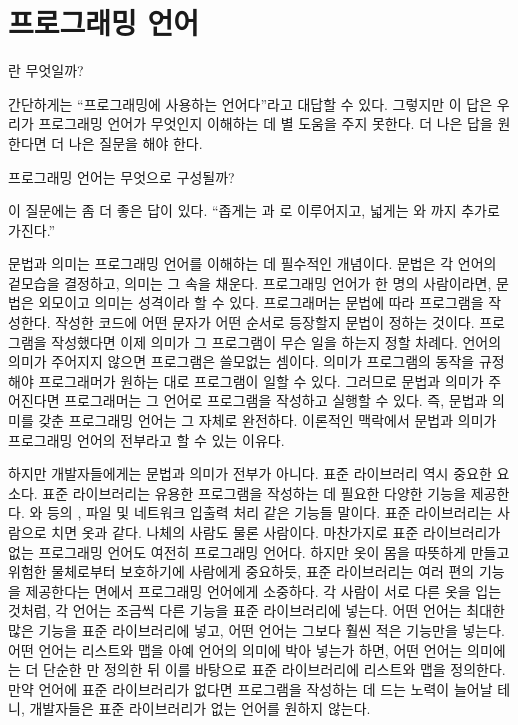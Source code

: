 \chapter{프로그래밍 언어}

란 무엇일까?

간단하게는 ``프로그래밍에 사용하는 언어다''라고 대답할 수 있다. 그렇지만 이 답은
우리가 프로그래밍 언어가 무엇인지 이해하는 데 별 도움을 주지 못한다. 더 나은
답을 원한다면 더 나은 질문을 해야 한다.

프로그래밍 언어는 무엇으로 구성될까?

이 질문에는 좀 더 좋은 답이 있다. ``좁게는 과
로 이루어지고, 넓게는 와 까지 추가로 가진다.''

문법과 의미는 프로그래밍 언어를 이해하는 데 필수적인 개념이다. 문법은 각 언어의
겉모습을 결정하고, 의미는 그 속을 채운다. 프로그래밍 언어가 한 명의 사람이라면,
문법은 외모이고 의미는 성격이라 할 수 있다. 프로그래머는 문법에 따라 프로그램을
작성한다. 작성한 코드에 어떤 문자가 어떤 순서로 등장할지 문법이 정하는 것이다.
프로그램을 작성했다면 이제 의미가 그 프로그램이 무슨 일을 하는지 정할 차례다.
언어의 의미가 주어지지 않으면 프로그램은 쓸모없는 셈이다. 의미가 프로그램의
동작을 규정해야 프로그래머가 원하는 대로 프로그램이 일할 수 있다. 그러므로
문법과 의미가 주어진다면 프로그래머는 그 언어로 프로그램을 작성하고 실행할 수
있다. 즉, 문법과 의미를 갖춘 프로그래밍 언어는 그 자체로 완전하다. 이론적인
맥락에서 문법과 의미가 프로그래밍 언어의 전부라고 할 수 있는 이유다.

하지만 개발자들에게는 문법과 의미가 전부가 아니다. 표준 라이브러리 역시 중요한
요소다. 표준 라이브러리는 유용한 프로그램을 작성하는 데 필요한 다양한 기능을
제공한다. 와  등의 ,
파일 및 네트워크 입출력 처리
 같은 기능들 말이다. 표준 라이브러리는 사람으로 치면 옷과 같다. 나체의
사람도 물론 사람이다. 마찬가지로 표준 라이브러리가 없는 프로그래밍 언어도 여전히
프로그래밍 언어다. 하지만 옷이 몸을 따뜻하게 만들고 위험한 물체로부터 보호하기에
사람에게 중요하듯, 표준 라이브러리는 여러 편의 기능을 제공한다는 면에서
프로그래밍 언어에게 소중하다. 각 사람이 서로 다른 옷을 입는 것처럼, 각 언어는
조금씩 다른 기능을 표준 라이브러리에 넣는다. 어떤 언어는 최대한 많은 기능을 표준
라이브러리에 넣고, 어떤 언어는 그보다 훨씬 적은 기능만을 넣는다. 어떤 언어는
리스트와 맵을 아예 언어의 의미에 박아 넣는가 하면, 어떤 언어는 의미에는 더
단순한 만 정의한 뒤 이를 바탕으로 표준 라이브러리에
리스트와 맵을 정의한다. 만약 언어에 표준 라이브러리가 없다면 프로그램을 작성하는
데 드는 노력이 늘어날 테니, 개발자들은 표준 라이브러리가 없는 언어를 원하지
않는다.


